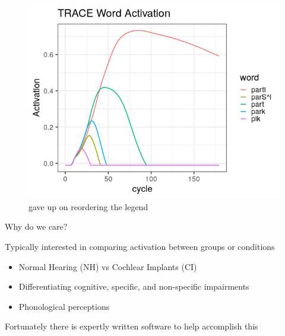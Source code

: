 \documentclass{beamer}
\begin{document}
\begin{frame}
\begin{figure}
\centering
\includegraphics[scale=0.5]{img/trace_plot.png}
\caption{gave up on reordering the legend}
\end{figure}
\end{frame}



\begin{frame}{Why do we care?}

Typically interested in comparing activation between groups or conditions \vspace{2mm}

\begin{itemize}
\item Normal Hearing (NH) vs Cochlear Implants (CI) \vspace{2mm}
\item Differentiating cognitive, specific, and non-specific impairments \vspace{2mm}
\item Phonological perceptions \vspace{2mm}
\end{itemize}

Fortunately there is expertly written software to help accomplish this

\end{frame}
\end{document}
